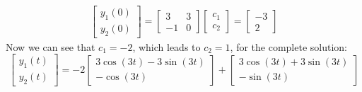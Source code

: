 \documentclass[12pt]{article}
\begin{document}
\begin{enumerate}[label = (\alph*)]
			\begin{align*}
				\begin{bmatrix}
				y_1(0) \\ y_2(0)	
				\end{bmatrix}
				= 
				\begin{bmatrix}
				3 & 3\\
				-1 & 0
				\end{bmatrix}
				\begin{bmatrix}
					c_1 \\ c_2
				\end{bmatrix}
				= 
				\begin{bmatrix}
					-3 \\ 2
				\end{bmatrix}
			\end{align*}
		Now we can see that $c_1 = -2$, which leads to $c_2 = 1$, for the complete solution:
			\boldmath
			$$
			\begin{bmatrix}
			y_1(t) \\ y_2(t)	
			\end{bmatrix}
			= -2
			\begin{bmatrix}
			3\cos(3t) - 3\sin(3t) \\
			-\cos(3t)
			\end{bmatrix}
			+ 
			\begin{bmatrix}
			3\cos(3t) + 3\sin(3t) \\
			-\sin(3t)
			\end{bmatrix}
			$$
			\unboldmath
	\end{enumerate}

\newpage
\end{document}
